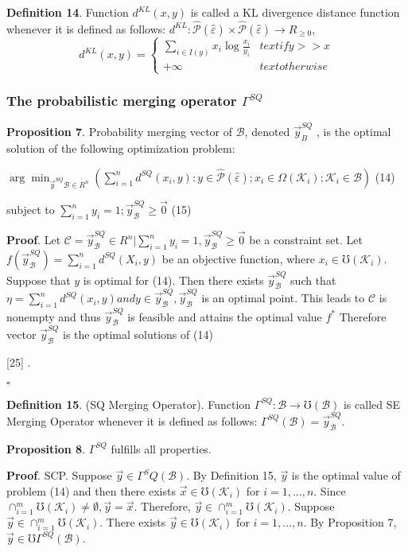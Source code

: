 \documentclass[]{iosart2c}
\begin{document}
\textbf{Definition 14}. Function $d^{KL}(x, y)$ is called a KL divergence distance function whenever it is defined as follows: $d^{KL} : \hat{\mathcal{P}} (\hat{\varepsilon}) \times \hat{\mathcal{P}} (\hat{\varepsilon}) \to R_{\geq0}$, $$d^{KL}(x, y) =
\begin{cases}
	\sum_{i \in I(y)} {x_i \log{\frac{x_i}{y_i}}} &text{if} y >> x \\
	+\infty 	&text{otherwise}
\end{cases}
$$

\subsubsection{The probabilistic merging operator $\Gamma^{SQ}$}

\textbf{Proposition 7}. Probability merging vector of $\mathcal{B}$, denoted $\vec{y}^{SQ}_B$ , is the optimal solution of the following optimization problem:

$\arg \min_{\vec{y}^{SQ}\mathcal{B} \in R^n}\left( \sum^n_{i=1} d^{SQ}(x_i, y) : y \in \hat{\mathcal{P}} (\hat{\varepsilon});x_i \in \Omega(\mathcal{K}_i);\mathcal{K}_i \in \mathcal{B} \right)$ (14)

subject to $\sum^n_{i=1}y_i = 1;\vec{y}^{SQ}_\mathcal{B} \geq \vec{0}$ (15)

\textbf{Proof}. Let $\mathcal{C} = {\vec{y}^{SQ}_\mathcal{B} \in R^n | \sum^n_{i=1}  y_i = 1, \vec{y}^{SQ}_\mathcal{B} \geq \vec{0}}$ be a constraint set. Let $f(\vec{y}^{SQ}_\mathcal{B} ) = \sum^n_{i=1} d^{SQ}(X_i, y)$ be an objective function, where $x_i \in \mho(\mathcal{K}_i)$. Suppose that $y$ is optimal for (14). Then there exists $\vec{y}^{SQ}_\mathcal{B}$ such that $\eta = \sum^n_{i=1} d^{SQ}(x_i, y) and y \in \vec{y}^{SQ}_\mathcal{B} , \vec{y}^{SQ}_\mathcal{B}$ is an optimal point. This leads to $\mathcal{C}$ is nonempty and thus $\vec{y}^{SQ}_\mathcal{B}$ is feasible and attains the optimal value $f^*$ Therefore vector $\vec{y}^{SQ}_\mathcal{B}$ is the optimal solutions of (14)

[25] .

$\square$

\textbf{Definition 15}. (SQ Merging Operator). Function $\Gamma^{SQ} : \mathcal{B} \to \mho (\mathcal{B})$ is called SE Merging Operator whenever it is defined as follows: 
$\Gamma^{SQ}(\mathcal{B}) = \vec{y}^{SQ}_\mathcal{B}$.

\textbf{Proposition 8}. $\Gamma^{SQ}$ fulfills all properties.

\textbf{Proof}. SCP. Suppose $\vec{y} \in \Gamma^SQ(\mathcal{B})$. By Definition 15, $\vec{y}$ is the optimal value of problem (14) and then there exists $\vec{x} \in \mho(\mathcal{K}_i)$ for $i = 1, ... , n$. Since $\cap^m_{i=1}\mho(\mathcal{K}_i) \neq \emptyset, \vec{y} = \vec{x}$. Therefore, $\vec{y} \in \cap^m_{i=1}\mho(\mathcal{K}_i)$. Suppose $\vec{y} \in \cap^m_{i=1}\mho(\mathcal{K}_i)$. There exists $\vec{y} \in \mho(\mathcal{K}_i)$ for $i = 1, ... , n$. By Proposition 7, $\vec{y} \in \mho\Gamma^{SQ}(\mathcal{B})$.
\end{document}
